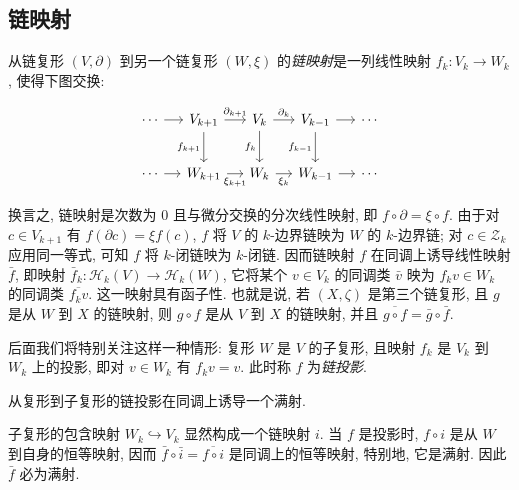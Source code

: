 \subsection{{链映射}}\label{sec:chain-maps}

{从链复形 $(V,\partial)$ 到另一个链复形 $(W,\xi)$ 的\emph{链映射}是一列线性映射 $f_k:V_k\to W_k$, 使得下图交换:}

\[
\begin{tikzcd}[column sep=1.2em,row sep=2.2em]
\cdots \arrow[r] & V_{k+1} \arrow[r,"\partial_{k+1}"] \arrow[d,"f_{k+1}"'] & V_k \arrow[r,"\partial_k"] \arrow[d,"f_k"'] & V_{k-1} \arrow[r] \arrow[d,"f_{k-1}"'] & \cdots \\
\cdots \arrow[r] & W_{k+1} \arrow[r,"\xi_{k+1}"'] & W_k \arrow[r,"\xi_k"'] & W_{k-1} \arrow[r] & \cdots
\end{tikzcd}
\]

{换言之, 链映射是次数为 0 且与微分交换的分次线性映射, 即 $f\circ\partial=\xi\circ f$. 由于对 $c\in V_{k+1}$ 有 $f(\partial c)=\xi f(c)$, $f$ 将 $V$ 的 $k$-边界链映为 $W$ 的 $k$-边界链; 对 $c\in\mathcal Z_k$ 应用同一等式, 可知 $f$ 将 $k$-闭链映为 $k$-闭链. 因而链映射 $f$ 在同调上诱导线性映射 $\bar f$, 即映射 $\bar f_k:\mathcal H_k(V)\to\mathcal H_k(W)$, 它将某个 $v\in V_k$ 的同调类 $\bar v$ 映为 $f_kv\in W_k$ 的同调类 $\overline{f_kv}$. 这一映射具有函子性. 也就是说, 若 $(X,\zeta)$ 是第三个链复形, 且 $g$ 是从 $W$ 到 $X$ 的链映射, 则 $g\circ f$ 是从 $V$ 到 $X$ 的链映射, 并且 $\overline{g\circ f}=\bar g\circ\bar f$.}

{后面我们将特别关注这样一种情形: 复形 $W$ 是 $V$ 的子复形, 且映射 $f_k$ 是 $V_k$ 到 $W_k$ 上的投影, 即对 $v\in W_k$ 有 $f_kv=v$. 此时称 $f$ 为\emph{链投影}.}

\begin{Proposition}\label{prop:chain-projection-homology-surjection}
{从复形到子复形的链投影在同调上诱导一个满射.}
\end{Proposition}

\begin{Proof}
{子复形的包含映射 $W_k\hookrightarrow V_k$ 显然构成一个链映射 $i$. 当 $f$ 是投影时, $f\circ i$ 是从 $W$ 到自身的恒等映射, 因而 $\bar f\circ\bar i=\overline{f\circ i}$ 是同调上的恒等映射, 特别地, 它是满射. 因此 $\bar f$ 必为满射.}
\end{Proof}

